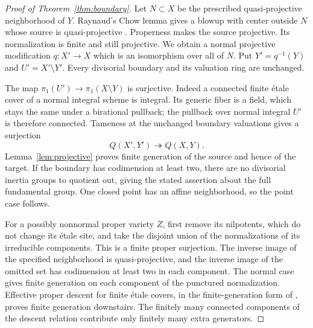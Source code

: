 \begin{proof}[Proof of Theorem~\ref{thm:boundary}]
Let $N\subset X$ be the prescribed quasi-projective neighborhood
of $Y$. Raynaud's Chow lemma gives a blowup with center outside
$N$ whose source is quasi-projective
\cite[Chapter 4, \S4, Proposition 5, p.~30]{Raynaud}.
Properness makes the source projective. Its normalization is
finite and still projective. We obtain a normal projective
modification $q:X'\to X$ which is an isomorphism over all of
$N$. Put $Y'=q^{-1}(Y)$ and $U'=X'\setminus Y'$.
Every divisorial boundary and its valuation ring are unchanged.

The map $\pi_1(U')\to\pi_1(X\setminus Y)$ is surjective.
Indeed a connected finite \'etale cover of a normal integral
scheme is integral. Its generic fiber is a field, which stays
the same under a birational pullback; the pullback over normal
integral $U'$ is therefore connected. Tameness at the unchanged
boundary valuations gives a surjection
\[
 Q(X',Y')\twoheadrightarrow Q(X,Y).
\]
Lemma~\ref{lem:projective} proves finite generation of the
source and hence of the target. If the boundary has codimension
at least two, there are no divisorial inertia groups to quotient
out, giving the stated assertion about the full fundamental group.
One closed point has an affine neighborhood, so the point case
follows.

For a possibly nonnormal proper variety $Z$, first remove its
nilpotents, which do not change its \'etale site, and take the
disjoint union of the normalizations of its irreducible components.
This is a finite proper surjection. The inverse image of the
specified neighborhood is quasi-projective, and the inverse
image of the omitted set has codimension at least two in each
component. The normal case gives finite generation on each
component of the punctured normalization. Effective proper
descent for finite \'etale covers, in the finite-generation form
of \cite[IX, Corollary 5.2, pp.~247--248]{SGA1}, proves finite
generation downstairs. The finitely many connected components
of the descent relation contribute only finitely many extra
generators.
\end{proof}

